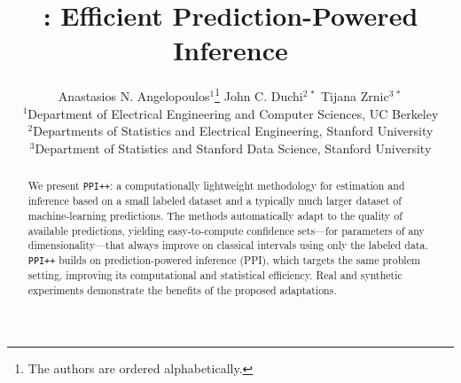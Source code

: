 \documentclass[11pt]{article}
\newcommand{\ppipp}{{\large \texttt{PPI++}}\xspace}
\newcommand{\ppipptitle}{{\fontsize{16pt}{0}\selectfont{\texttt{PPI\raisebox{.0ex}{++}}}\xspace}}
\begin{document}
\title{\ppipptitle: Efficient Prediction-Powered Inference}
\author{Anastasios N. Angelopoulos$^{1}$\footnote{The authors are ordered alphabetically.} \quad  John C. Duchi$^{2\,*}$ \quad  Tijana Zrnic$^{3\,*}$ \vspace{.5em} \\
  \normalsize{$^1$Department of Electrical Engineering and Computer Sciences, UC Berkeley}\\
  \normalsize{$^{2}$Departments of Statistics and Electrical Engineering,
    Stanford University} \\
  \normalsize{$^3$Department of Statistics and Stanford Data Science, Stanford University}
}
\date{}

\maketitle


\begin{abstract}
We present \ppipp: a computationally lightweight methodology for estimation and inference based on a small labeled dataset and a typically much larger dataset of machine-learning predictions. The methods automatically adapt to the quality of available
  predictions, yielding easy-to-compute confidence sets---for parameters
  of any dimensionality---that always improve on classical intervals using
  only the labeled data. \ppipp builds on prediction-powered inference (PPI),
  which targets the same problem setting, improving its computational and statistical efficiency.
Real and synthetic experiments demonstrate
  the benefits of the proposed adaptations.
\end{abstract}



















\newpage

\appendix





\end{document}
